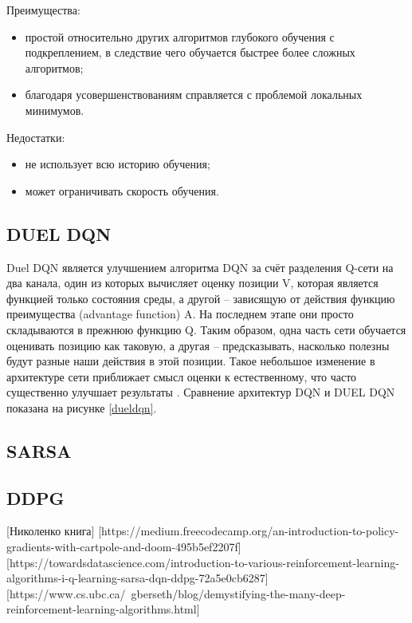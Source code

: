 Преимущества:
\begin{itemize}
	\item простой относительно других алгоритмов глубокого обучения с подкреплением, в следствие чего обучается быстрее более сложных алгоритмов;
	\item благодаря усовершенствованиям справляется с проблемой локальных минимумов.
\end{itemize}

Недостатки:
\begin{itemize}
	\item не использует всю историю обучения;
	\item может ограничивать скорость обучения.
\end{itemize}


\subsection{DUEL DQN}
Duel DQN является улучшением алгоритма DQN за счёт разделения Q-сети на два канала, один из которых вычисляет оценку позиции V, которая является функцией только состояния среды, а другой -- зависящую от действия функцию преимущества (advantage function) A. 
На последнем этапе они просто складываются в прежнюю функцию Q. 
Таким образом, одна часть сети обучается оценивать позицию как таковую, а другая -- предсказывать, насколько полезны будут разные наши действия в этой позиции. 
Такое небольшое изменение в архитектуре сети приближает смысл оценки к естественному, что часто существенно улучшает результаты \cite{DUEL_DQN}.
Сравнение архитектур DQN и DUEL DQN показана на рисунке \ref{dueldqn}.


\subsection{SARSA}
\subsection{DDPG}
[Николенко книга]
[https://medium.freecodecamp.org/an-introduction-to-policy-gradients-with-cartpole-and-doom-495b5ef2207f]
[https://towardsdatascience.com/introduction-to-various-reinforcement-learning-algorithms-i-q-learning-sarsa-dqn-ddpg-72a5e0cb6287]
[https://www.cs.ubc.ca/~gberseth/blog/demystifying-the-many-deep-reinforcement-learning-algorithms.html]

